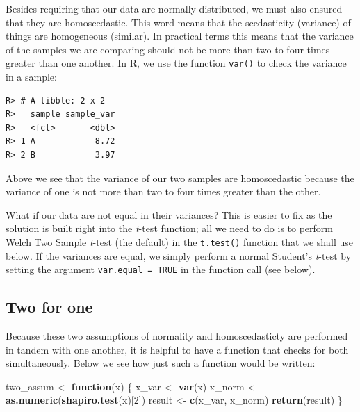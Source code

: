 \documentclass[english,10pt,a4paper,oneside]{book}
\newenvironment{Shaded}{\begin{snugshade}}{\end{snugshade}}
\newcommand{\ControlFlowTok}[1]{\textcolor[rgb]{0.13,0.29,0.53}{\textbf{#1}}}
\newcommand{\DataTypeTok}[1]{\textcolor[rgb]{0.13,0.29,0.53}{#1}}
\newcommand{\DecValTok}[1]{\textcolor[rgb]{0.00,0.00,0.81}{#1}}
\newcommand{\KeywordTok}[1]{\textcolor[rgb]{0.13,0.29,0.53}{\textbf{#1}}}
\newcommand{\NormalTok}[1]{#1}
\newcommand{\OperatorTok}[1]{\textcolor[rgb]{0.81,0.36,0.00}{\textbf{#1}}}
\newcommand{\StringTok}[1]{\textcolor[rgb]{0.31,0.60,0.02}{#1}}
\theoremstyle{definition}
\theoremstyle{definition}
\theoremstyle{definition}
\theoremstyle{remark}
\begin{document}
Besides requiring that our data are normally distributed, we must also
ensured that they are homoscedastic. This word means that the
scedasticity (variance) of things are homogeneous (similar). In
practical terms this means that the variance of the samples we are
comparing should not be more than two to four times greater than one
another. In R, we use the function \texttt{var()} to check the variance
in a sample:

\begin{Shaded}
\end{Shaded}

\begin{verbatim}
R> # A tibble: 2 x 2
R>   sample sample_var
R>   <fct>       <dbl>
R> 1 A            8.72
R> 2 B            3.97
\end{verbatim}

Above we see that the variance of our two samples are homoscedastic
because the variance of one is not more than two to four times greater
than the other.

What if our data are not equal in their variances? This is easier to fix
as the solution is built right into the \emph{t}-test function; all we
need to do is to perform Welch Two Sample \emph{t}-test (the default) in
the \texttt{t.test()} function that we shall use below. If the variances
are equal, we simply perform a normal Student's \emph{t}-test by setting
the argument \texttt{var.equal\ =\ TRUE} in the function call (see
below).

\hypertarget{two-for-one}{%
\subsection{Two for one}\label{two-for-one}}

Because these two assumptions of normality and homoscedasticty are
performed in tandem with one another, it is helpful to have a function
that checks for both simultaneously. Below we see how just such a
function would be written:

\begin{Shaded}
\begin{Highlighting}[]
\NormalTok{two_assum <-}\StringTok{ }\ControlFlowTok{function}\NormalTok{(x) \{}
\NormalTok{  x_var <-}\StringTok{ }\KeywordTok{var}\NormalTok{(x)}
\NormalTok{  x_norm <-}\StringTok{ }\KeywordTok{as.numeric}\NormalTok{(}\KeywordTok{shapiro.test}\NormalTok{(x)[}\DecValTok{2}\NormalTok{])}
\NormalTok{  result <-}\StringTok{ }\KeywordTok{c}\NormalTok{(x_var, x_norm)}
  \KeywordTok{return}\NormalTok{(result)}
\NormalTok{\}}
\end{Highlighting}
\end{Shaded}
\end{document}
